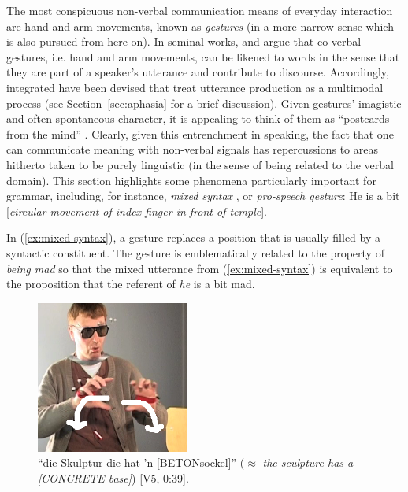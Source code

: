 \documentclass[output=paper]{langsci/langscibook}
\begin{document}
The most conspicuous non-verbal communication means of everyday interaction are hand and arm movements, known as \emph{gestures} (in a more narrow sense which is also pursued from here on).
%
In seminal works, \citet{McNeill:1985,McNeill:1992} and \citet{Kendon:1980,Kendon:2004} argue that co-verbal gestures, i.e. hand and arm movements, can be likened to words in the sense that they are part of a speaker's utterance and contribute to discourse.
%
Accordingly, integrated  have been devised \citep{Kita:Ozyurek:2003,de:Ruiter:2000,Krauss:Chen:Gottesmann:2000} that treat utterance production as a multimodal process (see Section~\ref{sec:aphasia} for a brief discussion).
%
Given gestures' imagistic  and often spontaneous character, it is appealing to think of them as \enquote{postcards from the mind} \citep[p.~21]{de:Ruiter:2007:a}.
%
Clearly, given this entrenchment in speaking, the fact that one can communicate meaning with non-verbal signals has repercussions to areas hitherto taken to be purely linguistic (in the sense of being related to the verbal domain).
%
This section highlights some phenomena particularly important for grammar, including, for instance,  \emph{mixed syntax}  \citep{Slama-Cazacu:1976}, or \emph{pro-speech gesture}: 
%
\ea \label{ex:mixed-syntax}
He is a bit [\textit{circular movement of index finger in front of temple}].
\z

In (\ref{ex:mixed-syntax}), a gesture replaces a position that is usually filled by a syntactic constituent.
%
The gesture is emblematically related to the property of \textit{being mad} so that the mixed utterance from (\ref{ex:mixed-syntax}) is equivalent to the proposition that the referent of \textit{he} is a bit mad.

\begin{figure}
  \centering
  \includegraphics[trim={0 0 0 4cm}, clip, width=5cm]{figures/Betonsockel-1}
  \caption[Sculpture]{\enquote{die Skulptur die hat 'n [BETONsockel]} ($\approx$ \textit{the sculpture has a [CONCRETE base]}) [V5, 0:39].}
  \label{fig:betonsockel}
\end{figure}
\end{document}
